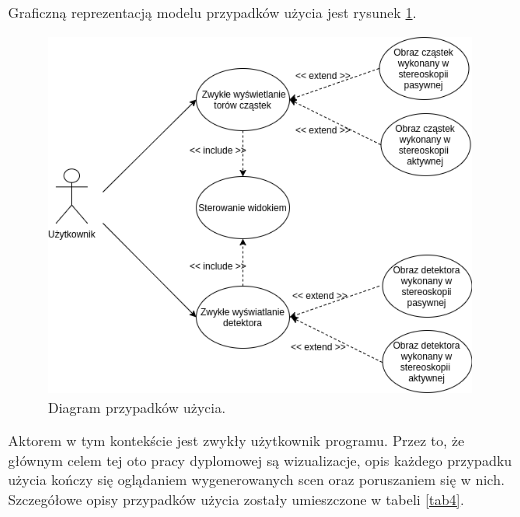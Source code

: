 Graficzną reprezentacją modelu przypadków użycia jest rysunek \ref{rys34}.

\begin{figure}[H]
		\centering
 		\includegraphics[width=14.0cm]{UseCase.png}
    	\caption{Diagram przypadków użycia.}
 		\label{rys34}
\end{figure}

Aktorem w tym kontekście jest zwykły użytkownik programu. Przez to, że głównym celem tej oto pracy dyplomowej są wizualizacje, opis każdego przypadku użycia kończy się oglądaniem wygenerowanych scen oraz poruszaniem się w nich. Szczegółowe opisy przypadków użycia zostały umieszczone w tabeli \ref{tab4}.

